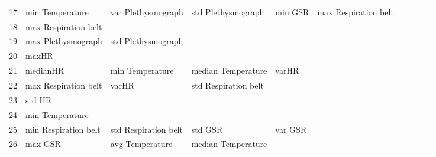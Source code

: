 \begin{landscape}
\begin{table}[]
\begin{tabular}{l|llllllll}
17       & min Temperature         & var Plethysmograph    & std Plethysmograph      & min GSR                 & max Respiration belt    &                       &                      &          &                      &        \\
18       & max Respiration belt    &                       &                         &                         &                         &                       &                      &          &                      &        \\
19       & max Plethysmograph      & std Plethysmograph    &                         &                         &                         &                       &                      &          &                      &        \\
20       & maxHR                   &                       &                         &                         &                         &                       &                      &          &                      &        \\
21       & medianHR                & min Temperature       & median Temperature      & varHR                   &                         &                       &                      &          &                      &        \\
22       & max Respiration belt    & varHR                 & std Respiration belt    &                         &                         &                       &                      &          &                      &        \\
23       & std HR                  &                       &                         &                         &                         &                       &                      &          &                      &        \\
24       & min Temperature         &                       &                         &                         &                         &                       &                      &          &                      &        \\
25       & min Respiration belt    & std Respiration belt  & std GSR                 & var GSR                 &                         &                       &                      &          &                      &        \\
26       & max GSR                 & avg Temperature       & median Temperature      &                         &                         &                       &                      &          &                      &        \\

\end{tabular}
\end{table}
\end{landscape}
